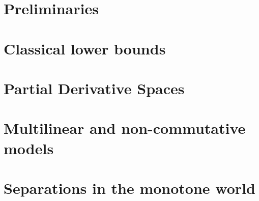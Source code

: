 \onehalfspace





\tableofcontents





\part{Preliminaries}










\part{Classical lower bounds}







\part{Partial Derivative Spaces}






\part[Multilinear and non-commutative models]{Multilinear and non-commutative models}















\part{Separations in the monotone world}

